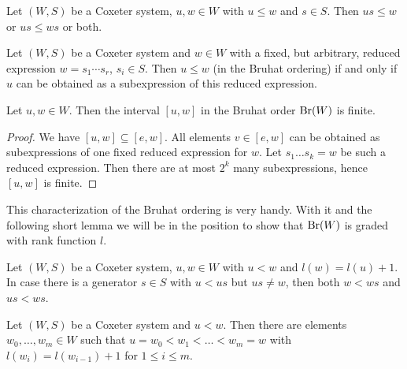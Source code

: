 \begin{prop}
	Let $(W,S)$ be a Coxeter system, $u,w \in W$ with $u \leq w$ and $s \in S$. Then $us \leq w$ or $us \leq ws$ or both.
\end{prop}

\begin{theo}
	Let $(W,S)$ be a Coxeter system and $w \in W$ with a fixed, but arbitrary, reduced expression $w = s_1 \cdots s_r$, $s_i \in S$. Then $u \leq w$ (in the Bruhat ordering) if and only if $u$ can be obtained as a subexpression of this reduced expression.
\end{theo}

\begin{coro}
	Let $u,w \in W$. Then the interval $[u,w]$ in the Bruhat order $\operatorname{Br}(W)$ is finite.

	\begin{proof}
		We have $[u,w] \subseteq [e,w]$. All elements $v \in [e,w]$ can be obtained as subexpressions of one fixed reduced expression for $w$. Let $s_1 \ldots s_k = w$ be such a reduced expression. Then there are at most $2^k$ many subexpressions, hence $[u,w]$ is finite.
	\end{proof}
\end{coro}

This characterization of the Bruhat ordering is very handy. With it and the following short lemma we will be in the position to show that $\operatorname{Br}(W)$ is graded with rank function $l$.

\begin{lemm}
	Let $(W,S)$ be a Coxeter system, $u,w \in W$ with $u < w$ and $l(w) = l(u) + 1$. In case there is a generator $s \in S$ with $u < us$ but $us \neq w$, then both $w < ws$ and $us < ws$.
\end{lemm}

\begin{prop}
	Let $(W,S)$ be a Coxeter system and $u < w$. Then there are elements $w_0,\ldots,w_m \in W$ such that $u = w_0 < w_1 < \ldots < w_m = w$ with $l(w_i) = l(w_{i-1}) + 1$ for $1 \leq i \leq m$.
\end{prop}

